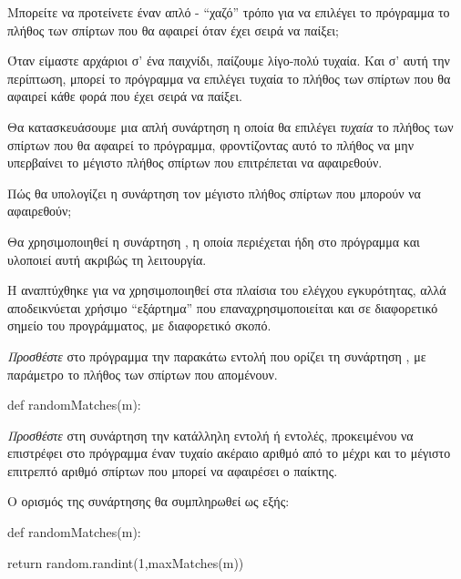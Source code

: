 \documentclass[a4paper,11pt,oneside]{book}
\begin{document}
\begin{step}
Μπορείτε να προτείνετε έναν απλό - ``χαζό'' τρόπο για να επιλέγει το πρόγραμμα το πλήθος των σπίρτων που θα αφαιρεί όταν έχει σειρά να παίξει;

\begin{answer}
Όταν είμαστε αρχάριοι σ' ένα παιχνίδι, παίζουμε λίγο-πολύ τυχαία. Και σ' αυτή την περίπτωση, μπορεί το πρόγραμμα να επιλέγει τυχαία το πλήθος των σπίρτων που θα αφαιρεί κάθε φορά που έχει σειρά να παίξει.
\end{answer}

Θα κατασκευάσουμε μια απλή συνάρτηση η οποία θα επιλέγει \emph{τυχαία} το πλήθος των σπίρτων που θα αφαιρεί το πρόγραμμα, φροντίζοντας αυτό το πλήθος να μην υπερβαίνει το μέγιστο πλήθος σπίρτων που επιτρέπεται να αφαιρεθούν.

Πώς θα υπολογίζει η συνάρτηση τον μέγιστο πλήθος σπίρτων που μπορούν να αφαιρεθούν;

\clearpage
\begin{answer}
Θα χρησιμοποιηθεί η συνάρτηση , η οποία περιέχεται ήδη στο πρόγραμμα και υλοποιεί αυτή ακριβώς τη λειτουργία. 

Η  αναπτύχθηκε για να χρησιμοποιηθεί στα πλαίσια του ελέγχου εγκυρότητας, αλλά αποδεικνύεται χρήσιμο ``εξάρτημα'' που επαναχρησιμοποιείται και σε διαφορετικό σημείο του προγράμματος, με διαφορετικό σκοπό.
\end{answer}

\emph{Προσθέστε} στο πρόγραμμα την παρακάτω εντολή που ορίζει τη συνάρτηση , με παράμετρο το πλήθος  των σπίρτων που απομένουν.

\begin{pynew}
def randomMatches(m):
\end{pynew}

\emph{Προσθέστε} στη συνάρτηση την κατάλληλη εντολή ή εντολές, προκειμένου να επιστρέφει στο πρόγραμμα έναν τυχαίο ακέραιο αριθμό από το  μέχρι και το μέγιστο επιτρεπτό αριθμό σπίρτων που μπορεί να αφαιρέσει ο παίκτης.

\begin{answer}
Ο ορισμός της συνάρτησης  θα συμπληρωθεί ως εξής:

\begin{pyplain}
def randomMatches(m):
\end{pyplain}
\begin{pynew}
    return random.randint(1,maxMatches(m))
\end{pynew}


\end{answer}
\end{step}
\end{document}
